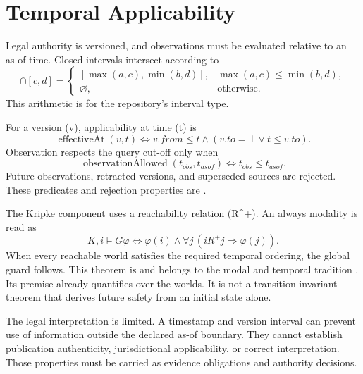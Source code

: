 \section{Temporal Applicability}
\label{sec:temporal}

Legal authority is versioned, and observations must be evaluated relative to an as-of time. Closed intervals intersect according to
\begin{equation}
[a,b]\cap[c,d]=
\begin{cases}
[\max(a,c),\min(b,d)],&\max(a,c)\le\min(b,d),\\
\varnothing,&\text{otherwise}.
\end{cases}
\label{eq:interval-intersection}
\end{equation}
This arithmetic is \formalized{} for the repository's interval type.

For a version (v), applicability at time (t) is
\begin{equation}
\operatorname{effectiveAt}(v,t)\iff
v.from\le t\land(v.to=\bot\lor t\le v.to).
\label{eq:effective-at}
\end{equation}
Observation respects the query cut-off only when
\begin{equation}
\operatorname{observationAllowed}(t_{obs},t_{asof})
\iff t_{obs}\le t_{asof}.
\label{eq:asof}
\end{equation}
Future observations, retracted versions, and superseded sources are rejected. These predicates and rejection properties are \formalized{}.

The Kripke component uses a reachability relation (R^+). An always modality is read as
\begin{equation}
K,i\models G\varphi\iff
\varphi(i)\land\forall j\,(iR^+j\Rightarrow\varphi(j)).
\label{eq:always}
\end{equation}
When every reachable world satisfies the required temporal ordering, the global guard follows. This theorem is \formalized{} and belongs to the modal and temporal tradition \citep{Kripke1963,Pnueli1977,ClarkeEtAl1986}. Its premise already quantifies over the worlds. It is not a transition-invariant theorem that derives future safety from an initial state alone.

The legal interpretation is limited. A timestamp and version interval can prevent use of information outside the declared as-of boundary. They cannot establish publication authenticity, jurisdictional applicability, or correct interpretation. Those properties must be carried as evidence obligations and authority decisions.

